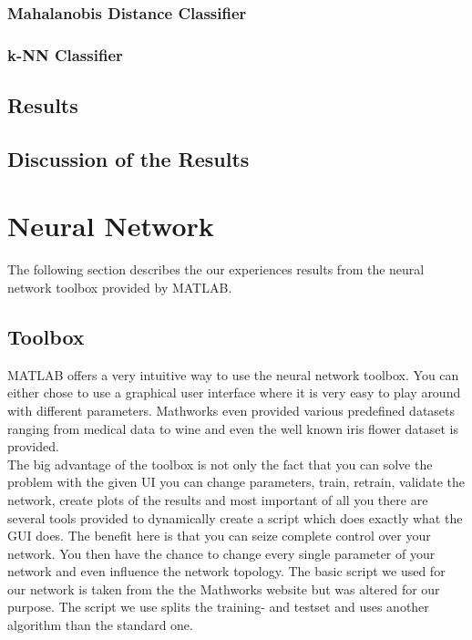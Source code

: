 \documentclass[subfigure,epsfig,fleqn,float,ausarbeitung]{scrartcl}
\begin{document}
\subsubsection{Mahalanobis Distance Classifier}

\subsubsection{k-NN Classifier}

\subsection{Results}

\subsection{Discussion of the Results}


\section{Neural Network}

The following section describes the our experiences results from the neural network toolbox provided by MATLAB.

\subsection{Toolbox}

MATLAB offers a very intuitive way to use the neural network toolbox. You can either chose to use a graphical user interface where it is very easy to play around with different parameters. Mathworks even provided various predefined datasets ranging from medical data to wine and even the well known iris flower dataset is provided. ~\\
The big advantage of the toolbox is not only the fact that you can solve the problem with the given UI you can change parameters, train, retrain, validate the network, create plots of the results and most important of all you there are several tools provided to dynamically create a script which does exactly what the GUI does. The benefit here is that you can seize complete control over your network. You then have the chance to change every single parameter of your network and even influence the network topology. The basic script we used for our network is taken from the the Mathworks website but was altered for our purpose. The script we use splits the training- and testset and uses another algorithm than the standard one. 
\end{document}
